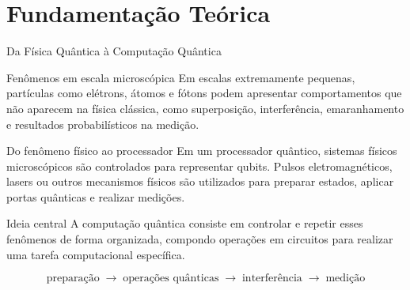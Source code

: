 \section{Fundamentação Teórica}

\begin{frame}{Da Física Quântica à Computação Quântica}

\begin{block}{Fenômenos em escala microscópica}
Em escalas extremamente pequenas, partículas como elétrons, átomos e
fótons podem apresentar comportamentos que não aparecem na física
clássica, como superposição, interferência, emaranhamento e resultados probabilísticos na medição.
\end{block}

\begin{block}{Do fenômeno físico ao processador}
Em um processador quântico, sistemas físicos microscópicos são controlados
para representar qubits. Pulsos eletromagnéticos, lasers ou outros
mecanismos físicos são utilizados para preparar estados, aplicar portas
quânticas e realizar medições.
\end{block}

\begin{alertblock}{Ideia central}
A computação quântica consiste em controlar e repetir esses fenômenos de
forma organizada, compondo operações em circuitos para realizar uma tarefa
computacional específica.
\end{alertblock}

\[
\text{preparação}
\;\longrightarrow\;
\text{operações quânticas}
\;\longrightarrow\;
\text{interferência}
\;\longrightarrow\;
\text{medição}
\]

\end{frame}

